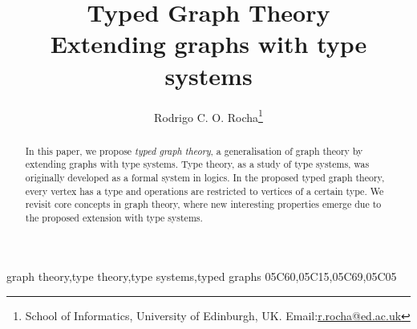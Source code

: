\documentclass[preprint,12pt]{elsarticle}
\theoremstyle{plain}
\begin{document}
\begin{frontmatter}


\title{Typed Graph Theory\\Extending graphs with type systems}





\author{Rodrigo C. O. Rocha\footnote{School of Informatics, University of Edinburgh, UK. Email:\url{r.rocha@ed.ac.uk}}}

\begin{abstract}
In this paper, we propose \textit{typed graph theory},
a generalisation of graph theory by extending
graphs with type systems.
Type theory, as a study of type systems,
was originally developed as a formal system in logics.
In the proposed typed graph theory, every vertex has a type
and operations are restricted to vertices of a certain type.
We revisit core concepts in graph theory, where
new interesting properties emerge due to the proposed
extension with type systems.
\end{abstract}

\begin{keyword}
graph theory\sep type theory\sep type systems\sep typed graphs
\MSC[2010] 05C60\sep 05C15\sep 05C69\sep 05C05
\end{keyword}

\end{frontmatter}
\end{document}
